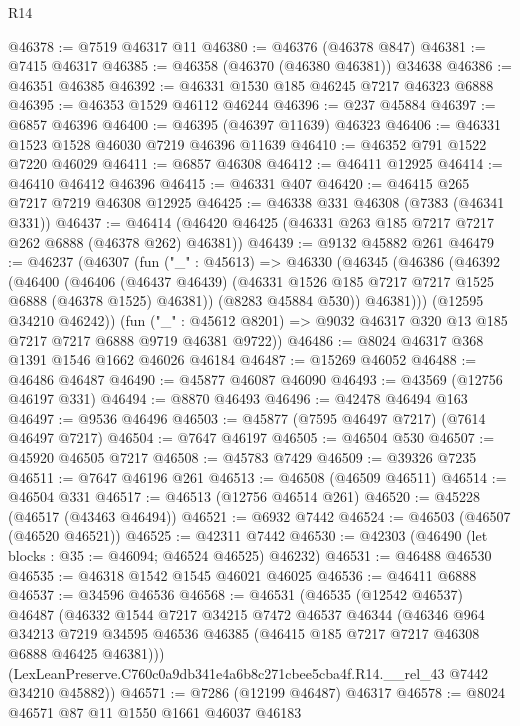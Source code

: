 \begin{lexlean}{R14}
\begin{coremodule}
@46378 := @7519 @46317 @11
@46380 := @46376 (@46378 @847)
@46381 := @7415 @46317
@46385 := @46358 (@46370 (@46380 @46381)) @34638
@46386 := @46351 @46385
@46392 := @46331 @1530 @185 @46245 @7217 @46323 @6888
@46395 := @46353 @1529 @46112 @46244
@46396 := @237 @45884
@46397 := @6857 @46396
@46400 := @46395 (@46397 @11639) @46323
@46406 := @46331 @1523 @1528 @46030 @7219 @46396 @11639
@46410 := @46352 @791 @1522 @7220 @46029
@46411 := @6857 @46308
@46412 := @46411 @12925
@46414 := @46410 @46412 @46396
@46415 := @46331 @407
@46420 := @46415 @265 @7217 @7219 @46308 @12925
@46425 := @46338 @331 @46308 (@7383 (@46341 @331))
@46437 := @46414 (@46420 @46425 (@46331 @263 @185 @7217 @7217 @262 @6888 (@46378 @262) @46381))
@46439 := @9132 @45882 @261
@46479 := @46237
    (@46307
      (fun ("_" : @45613) =>
      @46330
        (@46345
          (@46386
            (@46392
              (@46400
                (@46406
                  (@46437 @46439)
                  (@46331 @1526 @185 @7217 @7217 @1525 @6888 (@46378 @1525) @46381))
                (@8283 @45884 @530))
              @46381)))
        (@12595 @34210 @46242))
      (fun ("_" : @45612 @8201) => @9032 @46317 @320 @13 @185 @7217 @7217 @6888 @9719 @46381 @9722))
@46486 := @8024 @46317 @368 @1391 @1546 @1662 @46026 @46184
@46487 := @15269 @46052
@46488 := @46486 @46487
@46490 := @45877 @46087 @46090
@46493 := @43569 (@12756 @46197 @331)
@46494 := @8870 @46493
@46496 := @42478 @46494 @163
@46497 := @9536 @46496
@46503 := @45877 (@7595 @46497 @7217) (@7614 @46497 @7217)
@46504 := @7647 @46197
@46505 := @46504 @530
@46507 := @45920 @46505 @7217
@46508 := @45783 @7429
@46509 := @39326 @7235
@46511 := @7647 @46196 @261
@46513 := @46508 (@46509 @46511)
@46514 := @46504 @331
@46517 := @46513 (@12756 @46514 @261)
@46520 := @45228 (@46517 (@43463 @46494))
@46521 := @6932 @7442
@46524 := @46503 (@46507 (@46520 @46521))
@46525 := @42311 @7442
@46530 := @42303 (@46490 (let blocks : @35 := @46094; @46524 @46525) @46232)
@46531 := @46488 @46530
@46535 := @46318 @1542 @1545 @46021 @46025
@46536 := @46411 @6888
@46537 := @34596 @46536
@46568 := @46531
    (@46535
      (@12542 @46537)
      @46487
      (@46332
        @1544
        @7217
        @34215
        @7472
        @46537
        @46344
        (@46346
          @964
          @34213
          @7219
          @34595
          @46536
          @46385
          (@46415 @185 @7217 @7217 @46308 @6888 @46425 @46381)))
      (LexLeanPreserve.C760c0a9db341e4a6b8c271cbee5cba4f.R14.__rel_43 @7442 @34210 @45882))
@46571 := @7286 (@12199 @46487) @46317
@46578 := @8024 @46571 @87 @11 @1550 @1661 @46037 @46183

\end{coremodule}
\end{lexlean}
